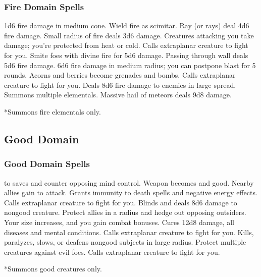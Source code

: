 \subsubsection{Fire Domain Spells}
\begin{spelllist}
   1d6 fire damage in medium cone.
  \spellhead[1]{}
   Wield fire as scimitar.
   Ray (or rays) deal 4d6 fire damage.
  \spellhead[3]{}
   Small radius of fire deals 3d6 damage.
   Creatures attacking you take damage; you're protected from heat or cold.
   Calls extraplanar creature to fight for you.
   Smite foes with divine fire for 5d6 damage.
   Passing through wall deals 5d6 fire damage.
   6d6 fire damage in medium radius; you can postpone blast for 5 rounds.
   Acorns and berries become grenades and bombs.
  \spellhead[7]{}
   Calls extraplanar creature to fight for you.
   Deals 8d6 fire damage to enemies in large spread.
   Summons multiple elementals.
   Massive hail of meteors deals 9d8 damage.
\end{spelllist}
*Summons fire elementals only.

\subsection{Good Domain}
\subsubsection{Good Domain Spells}
\begin{spelllist}
  \spellhead[1]{}
    to saves and counter opposing mind control.
   Weapon becomes  and good.
   Nearby allies gain  to attack.
   Grants immunity to death spells and negative energy effects.
   Calls extraplanar creature to fight for you.
  \spellhead[4]{}
   Blinds and deals 8d6 damage to nongood creature.
   Protect allies in a \areamed radius and hedge out opposing outsiders.
   Your size increases, and you gain combat bonuses.
   Cures 12d8 damage, all diseases and mental conditions.
   Calls extraplanar creature to fight for you.
  \F Kills, paralyzes, slows, or deafens nongood subjects in large radius.
  \spellhead[7]{}
  \spellhead[8]{}
   Protect multiple creatures against evil foes. 
  \spellhead[9]{}
   Calls extraplanar creature to fight for you.
\end{spelllist}
*Summons good creatures only.

